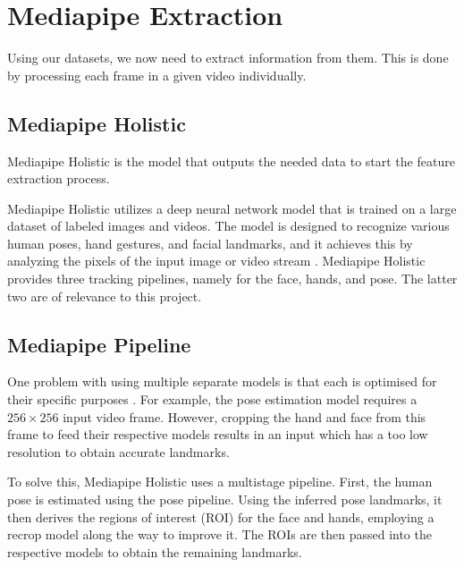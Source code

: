 \documentclass[final,rdr32.tex]{subfiles}
\begin{document}
\section{Mediapipe Extraction}
\label{sec:mediapipe}

Using our datasets, we now need to extract information from them. This is done by processing each frame in a given video individually.

\subsection{Mediapipe Holistic}

Mediapipe Holistic is the model that outputs the needed data to start the feature extraction process.

Mediapipe Holistic utilizes a deep neural network model that is trained on a large dataset of labeled images and videos. The model is designed to recognize various human poses, hand gestures, and facial landmarks, and it achieves this by analyzing the pixels of the input image or video stream \cite{grishchenko_bazarevsky_2020}. Mediapipe Holistic provides three tracking pipelines, namely for the face, hands, and pose. The latter two are of relevance to this project.

\subsection{Mediapipe Pipeline}

One problem with using multiple separate models is that each is optimised for their specific purposes \cite{grishchenko_bazarevsky_2020}. For example, the pose estimation model requires a $256 \times 256$ input video frame. However, cropping the hand and face from this frame to feed their respective models results in an input which has a too low resolution to obtain accurate landmarks.

To solve this, Mediapipe Holistic uses a multistage pipeline. First, the human pose is estimated using the pose pipeline. Using the inferred pose landmarks, it then derives the regions of interest (ROI) for the face and hands, employing a recrop model along the way to improve it. The ROIs are then passed into the respective models to obtain the remaining landmarks.
\end{document}
